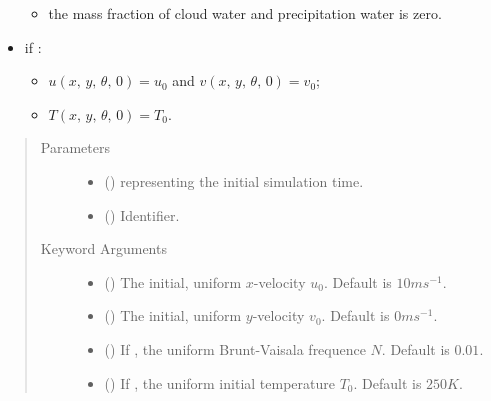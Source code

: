 \documentclass[letterpaper,10pt,english]{sphinxmanual}
\begin{document}
\begin{fulllineitems}
\begin{fulllineitems}
\begin{itemize}
\begin{itemize}
\item {} 
the mass fraction of cloud water and precipitation water is zero.

\end{itemize}

\item {} 
if :
\begin{itemize}
\item {} 
\(u(x, \, y, \, \theta, \, 0) = u_0\) and \(v(x, \, y, \, \theta, \, 0) = v_0\);

\item {} 
\(T(x, \, y, \, \theta, \, 0) = T_0\).

\end{itemize}

\end{itemize}
\begin{quote}\begin{description}
\item[{Parameters}] \leavevmode\begin{itemize}
\item {} 
 () \textendash{}  representing the initial simulation time.

\item {} 
 () \textendash{} Identifier.

\end{itemize}

\item[{Keyword Arguments}] \leavevmode\begin{itemize}
\item {} 
 () \textendash{} The initial, uniform \(x\)-velocity \(u_0\). Default is \(10 m s^{-1}\).

\item {} 
 () \textendash{} The initial, uniform \(y\)-velocity \(v_0\). Default is \(0 m s^{-1}\).

\item {} 
 () \textendash{} If , the uniform Brunt-Vaisala frequence \(N\). Default is \(0.01\).

\item {} 
 () \textendash{} If , the uniform initial temperature \(T_0\). Default is \(250 K\).


\end{itemize}
\end{description}
\end{quote}
\end{fulllineitems}
\end{fulllineitems}
\end{document}
